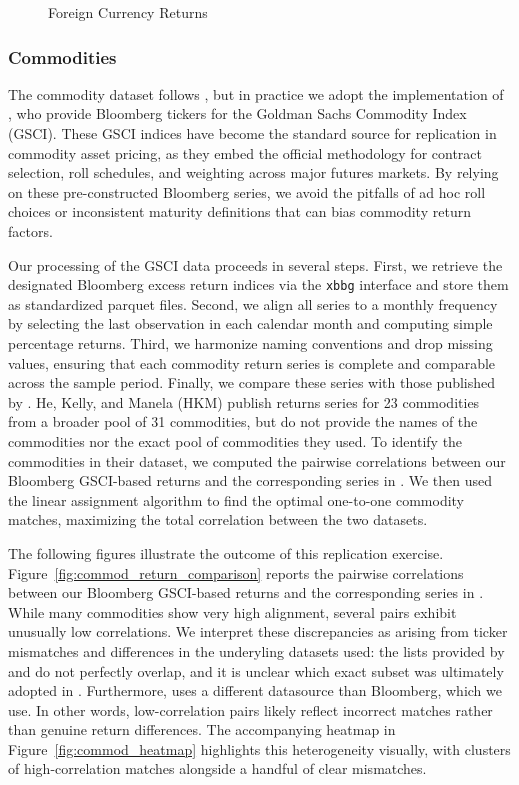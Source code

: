 \documentclass{article}
\begin{document}
\begin{appendices}
\begin{figure}
  \caption{Foreign Currency Returns}
  \label{fig:fx_returns}
\end{figure}

\FloatBarrier

\subsubsection{Commodities}
\label{sec:commodities}
The commodity dataset follows \cite{Yang2013}, but in practice we adopt the 
implementation of \cite{Koijen2018}, who provide Bloomberg tickers for the 
Goldman Sachs Commodity Index (GSCI). These GSCI indices have become the 
standard source for replication in commodity asset pricing, as they embed the 
official methodology for contract selection, roll schedules, and weighting 
across major futures markets. By relying on these pre-constructed Bloomberg 
series, we avoid the pitfalls of ad hoc roll choices or inconsistent maturity 
definitions that can bias commodity return factors.

Our processing of the GSCI data proceeds in several steps. First, we retrieve the 
designated Bloomberg excess return indices via the \texttt{xbbg} interface and 
store them as standardized parquet files. Second, we align all series to a 
monthly frequency by selecting the last observation in each calendar month and 
computing simple percentage returns. Third, we harmonize naming conventions and 
drop missing values, ensuring that each commodity return series is complete and 
comparable across the sample period. Finally, we compare these series
with those published by \cite{He2017}. He, Kelly, and Manela (HKM) publish returns series for 23 commodities from a broader pool of 31 commodities, but do not provide the names of the commodities nor the exact pool of commodities they used. To identify the commodities in their dataset, we computed the pairwise correlations between our Bloomberg GSCI-based returns and the corresponding series in \cite{He2017}. We then used the linear assignment algorithm to find the optimal one-to-one commodity matches, maximizing the total correlation between the two datasets.

The following figures illustrate the outcome of this replication exercise. 
Figure~\ref{fig:commod_return_comparison} reports the pairwise correlations between our 
Bloomberg GSCI-based returns and the corresponding series in \cite{He2017}. 
While many commodities show very high alignment, several pairs exhibit unusually 
low correlations. We interpret these discrepancies as arising from ticker 
mismatches and differences in the underyling datasets used: the lists provided by \cite{Koijen2018} and \cite{Yang2013} do not 
perfectly overlap, and it is unclear which exact subset was ultimately adopted 
in \cite{He2017}. Furthermore, \cite{He2017} uses a different datasource than
Bloomberg, which we use.
In other words, low-correlation pairs likely reflect incorrect 
matches rather than genuine return differences. The accompanying heatmap in 
Figure~\ref{fig:commod_heatmap} highlights this heterogeneity visually, with 
clusters of high-correlation matches alongside a handful of clear mismatches.


\end{appendices}
\end{document}
